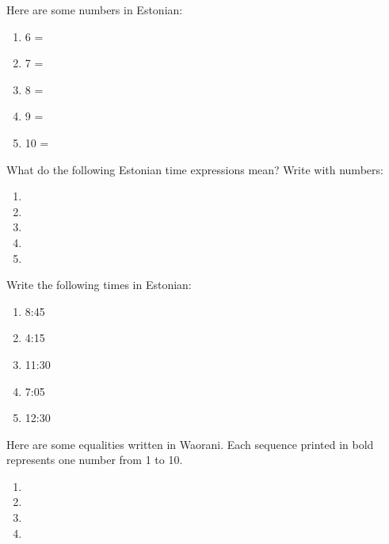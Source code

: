 \begin{refsection}
\begin{problem}{\langnameEstonian}{\nameBNewsome}{}
Here are some numbers in Estonian:
\begin{multicols}{5}
\begin{enumerate}[leftmargin = 0pt]
    \item[] 6 = 
    \item[] 7 = 
    \item[] 8 = 
    \item[] 9 = 
    \item[] 10 = 
\end{enumerate}
\end{multicols}

\begin{assgts}
\item What do the following Estonian time expressions mean? Write with numbers:
\begin{enumerate}[label = \alph*.]
    \item {}
    \item {}
    \item {}
    \item {}
    \item {}
\end{enumerate}
\item Write the following times in Estonian:
\begin{multicols}{5}
\begin{enumerate}[label = \alph*., start = 6]
    \item 8:45
    \item 4:15
    \item 11:30
    \item 7:05
    \item 12:30
\end{enumerate}
\end{multicols}
\end{assgts}
\end{problem}

\begin{problem}{\langnameWaorani}{\nameDRadev}{}
Here are some equalities written in Waorani. Each sequence printed in bold represents one number from 1 to 10.

\begin{enumerate}[label=(\arabic*)]
\item {}
\item {}
\item {}
\item {}
\end{enumerate}


\end{problem}
\end{refsection}
